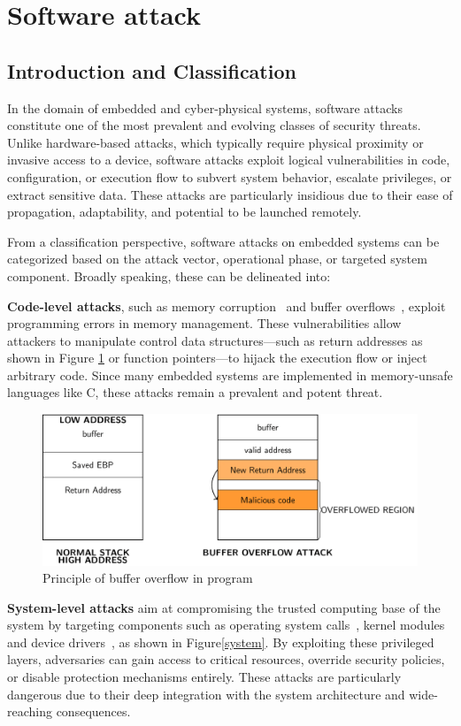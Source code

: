 \section{Software attack}
\subsection{Introduction and Classification}
In the domain of embedded and cyber-physical systems, software attacks \cite{6832002} constitute one of the most prevalent and evolving classes of security threats. Unlike hardware-based attacks, which typically require physical proximity or invasive access to a device, software attacks exploit logical vulnerabilities in code, configuration, or execution flow to subvert system behavior, escalate privileges, or extract sensitive data. These attacks are particularly insidious due to their ease of propagation, adaptability, and potential to be launched remotely.

From a classification perspective, software attacks on embedded systems can be categorized based on the attack vector, operational phase, or targeted system component. Broadly speaking, these can be delineated into:

\textbf{Code-level attacks}, such as memory corruption~\cite{1467812} and buffer overflows~\cite{821514}, exploit programming errors in memory management. These vulnerabilities allow attackers to manipulate control data structures—such as return addresses as shown in Figure \ref{buffer} or function pointers—to hijack the execution flow or inject arbitrary code. Since many embedded systems are implemented in memory-unsafe languages like C, these attacks remain a prevalent and potent threat.

\begin{figure}[t!]
  \centering
  \includegraphics[width=0.5\linewidth]{Chapitre1/figures/buffer overflow.png}
  \caption{Principle of buffer overflow in program}
  \label{buffer}
\end{figure}

\textbf{System-level attacks} aim at compromising the trusted computing base of the system by targeting components such as operating system calls~\cite{9251949}, kernel modules~\cite{chen2011linux} and device drivers~\cite{yuce2018fault}, as shown in Figure\ref{system}. By exploiting these privileged layers, adversaries can gain access to critical resources, override security policies, or disable protection mechanisms entirely. These attacks are particularly dangerous due to their deep integration with the system architecture and wide-reaching consequences.

